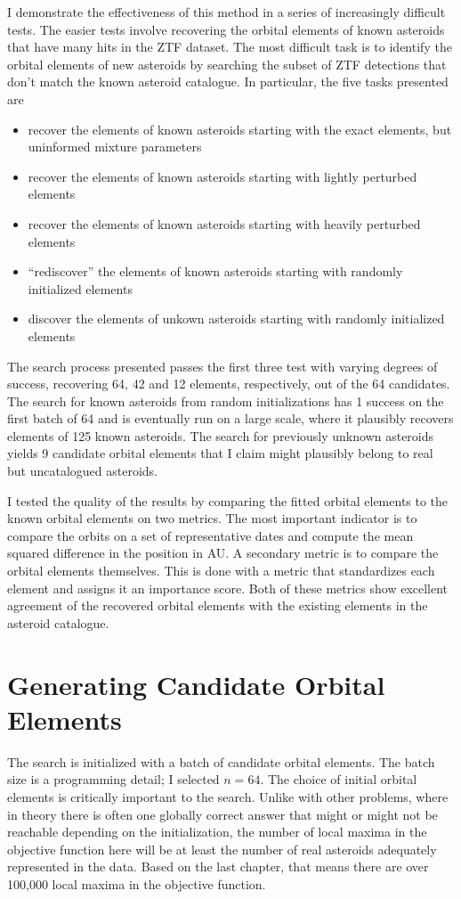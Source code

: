I demonstrate the effectiveness of this method in a series of increasingly difficult tests.  
The easier tests involve recovering the orbital elements of known asteroids that have many hits in the ZTF dataset.
The most difficult task is to identify the orbital elements of new asteroids by searching the subset of ZTF detections that don't match the known asteroid catalogue.
In particular, the five tasks presented are
\begin{itemize}
\item recover the elements of known asteroids starting with the exact elements, but uninformed mixture parameters
\item recover the elements of known asteroids starting with lightly perturbed elements
\item recover the elements of known asteroids starting with heavily perturbed elements
\item ``rediscover'' the elements of known asteroids starting with randomly initialized elements
\item discover the elements of unkown asteroids starting with randomly initialized elements
\end{itemize}
The search process presented passes the first three test with varying degrees of success, 
recovering 64, 42 and 12 elements, respectively, out of the 64 candidates.
The search for known asteroids from random initializations has 1 success on the first batch of 64 and is eventually run on a large scale,
where it plausibly recovers elements of 125 known asteroids.
The search for previously unknown asteroids yields 9 candidate orbital elements that I claim 
might plausibly belong to real but uncatalogued asteroids.

I tested the quality of the results by comparing the fitted orbital elements to the known orbital elements on two metrics.
The most important indicator is to compare the orbits on a set of representative dates and compute the mean squared difference in the position in AU.
A secondary metric is to compare the orbital elements themselves.  
This is done with a metric that standardizes each element and assigns it an importance score.
Both of these metrics show excellent agreement of the recovered orbital elements with the existing elements in the asteroid catalogue.

\section{Generating Candidate Orbital Elements}
\label{section_candidate_elements}
The search is initialized with a batch of candidate orbital elements. 
The batch size is a programming detail; I selected $n=64$.
The choice of initial orbital elements is critically important to the search.
Unlike with other problems, where in theory there is often one globally correct answer 
that might or might not be reachable depending on the initialization, 
the number of local maxima in the objective function here will be at least the number of real asteroids adequately represented in the data.
Based on the last chapter, that means there are over 100,000 local maxima in the objective function.

